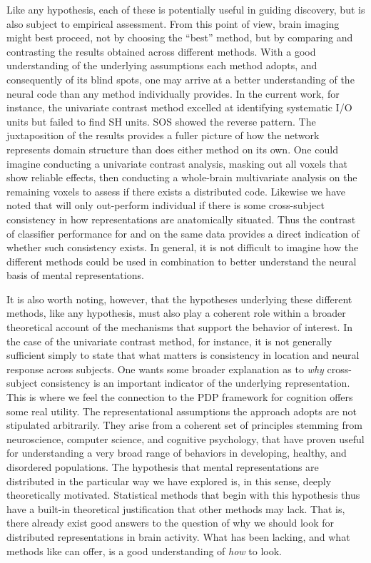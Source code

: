 Like any hypothesis, each of these is potentially useful in guiding discovery, but is also subject to empirical assessment. From this point of view, brain imaging might best proceed, not by choosing the ``best'' method, but by comparing and contrasting the results obtained across different methods. With a good understanding of the underlying assumptions each method adopts, and consequently of its blind spots, one may arrive at a better understanding of the neural code than any method individually provides. In the current work, for instance, the univariate contrast method excelled at identifying systematic I/O units but failed to find SH units. SOS {\lasso} showed the reverse pattern. The juxtaposition of the results provides a fuller picture of how the network represents domain structure than does either method on its own. One could imagine conducting a univariate contrast analysis, masking out all voxels that show reliable effects, then conducting a whole-brain multivariate analysis on the remaining voxels to assess if there exists a distributed code. Likewise we have noted that {\soslasso} will only out-perform individual {\lasso} if there is some cross-subject consistency in how representations are anatomically situated. Thus the contrast of classifier performance for {\lasso} and {\soslasso} on the same data provides a direct indication of whether such consistency exists. In general, it is not difficult to imagine how the different methods could be used in combination to better understand the neural basis of mental representations.

It is also worth noting, however, that the hypotheses underlying these different methods, like any hypothesis, must also play a coherent role within a broader theoretical account of the mechanisms that support the behavior of interest. In the case of the univariate contrast method, for instance, it is not generally sufficient simply to state that what matters is consistency in location and neural response across subjects. One wants some broader explanation as to {\em why} cross-subject consistency is an important indicator of the underlying representation. This is where we feel the connection to the PDP framework for cognition offers some real utility. The representational assumptions the approach adopts are not stipulated arbitrarily. They arise from a coherent set of principles stemming from neuroscience, computer science, and cognitive psychology, that have proven useful for understanding a very broad range of behaviors in developing, healthy, and disordered populations. The hypothesis that mental representations are distributed in the particular way we have explored is, in this sense, deeply theoretically motivated. Statistical methods that begin with this hypothesis thus have a built-in theoretical justification that other methods may lack. That is, there already exist good answers to the question of why we should look for distributed representations in brain activity. What has been lacking, and what methods like {\soslasso} can offer, is a good understanding of {\em how} to look.

 
